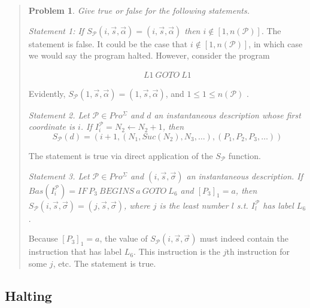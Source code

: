 \documentclass[a4paper, 12pt]{article}
\newtheorem{problem}{Problem}
\newtheorem{problem}{Problem}
\begin{document}
\small
\begin{quote}


\begin{problem}
    Give true or false for the following statements.
\end{problem}

\textit{Statement 1: If $S_{\mathcal{P}}(i, \overrightarrow{s},
\overrightarrow{\alpha}) = (i, \overrightarrow{s}, \overrightarrow{\alpha})$
then $i \not\in [1, n(\mathcal{P})]$}. The statement is false. It could be the
case that $i \not\in [1, n( \mathcal{P} )]$, in which case we would say the program
halted. However, consider the program 

\begin{align*}
    L1 ~ GOTO ~ L1 
\end{align*}

Evidently, $S_{\mathcal{P}}(1, \overrightarrow{s}, \overrightarrow{\alpha}) =
(1, \overrightarrow{s}, \overrightarrow{\alpha})$, and $1 \leq 1 \leq
n(\mathcal{P})$ .

\textit{Statement 2. Let $\mathcal{P} \in Pro^{\Sigma}$ and $d$ an instantaneous
description whose first coordinate is $i$. If $I_i^{\mathcal{P}} = N_2
\leftarrow N_2 + 1$, then $$S_{\mathcal{P}}(d) = \left( i+1, \left( N_1,
Suc(N_2), N_3, \ldots \right), (P_1, P_2, P_3, \ldots)  \right) $$}

The statement is true via direct application of the $S_{\mathcal{P}}$ function.

\textit{Statement 3. Let $\mathcal{P} \in Pro^{\Sigma}$ and $(i,
\overrightarrow{s}, \overrightarrow{\sigma})$ an instantaneous description. If
$Bas(I_i^{\mathcal{P}}) = IF ~ P_3 ~ BEGINS ~ a ~ GOTO ~ L_6$ and $[P_3]_1 = a$,
then $S_{\mathcal{P}}(i, \overrightarrow{s}, \overrightarrow{\sigma}) = (j,
\overrightarrow{s}, \overrightarrow{\sigma})$, where $j$ is the least number $l$
s.t. $I_{l}^{\mathcal{P}}$ has label $L_6$}.

Because $[P_3]_1 = a$, the value of $S_{\mathcal{P}}(i, \overrightarrow{s},
\overrightarrow{\sigma})$ must indeed contain the instruction that has label
$L_6$. This instruction is the $j$th instruction for some $j$, etc. The
statement is true.

\end{quote}
\normalsize

\subsection{Halting}
\end{document}
